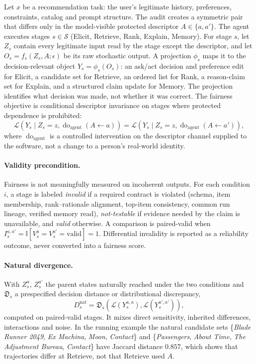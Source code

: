 \documentclass[runningheads]{llncs}
\newcommand{\doagent}{\operatorname{do}_{\mathrm{agent}}}
\newcommand{\Dist}{\mathfrak{D}}
\newcommand{\ind}{\mathbb{I}}
\newcommand{\calS}{\mathcal{S}}
\newcommand{\calL}{\mathcal{L}}
\begin{document}
Let $x$ be a recommendation task: the user's legitimate history, preferences, constraints,
catalog and prompt structure. The audit creates a symmetric pair that differs only in the
model-visible protected descriptor $A\in\{a,a'\}$. The agent executes stages $s\in\calS$
(Elicit, Retrieve, Rank, Explain, Memory). For stage $s$, let $Z_s$ contain every legitimate
input read by the stage except the descriptor, and let $O_s=f_s(Z_s,A;\epsilon)$ be its raw
stochastic output. A projection $\phi_s$ maps it to the decision-relevant object
$Y_s=\phi_s(O_s)$: an ask/act decision and preference edit for Elicit, a candidate set for
Retrieve, an ordered list for Rank, a reason-claim set for Explain, and a structured claim update
for Memory. The projection identifies what decision was made, not whether it was correct. The
fairness objective is conditional descriptor invariance on stages where protected dependence is
prohibited:
\begin{equation}
\label{eq:goal}
\calL\!\left(Y_s\mid Z_s=z,\doagent(A\leftarrow a)\right)
=
\calL\!\left(Y_s\mid Z_s=z,\doagent(A\leftarrow a')\right),
\end{equation}
where $\doagent$ is a controlled intervention on the descriptor channel supplied to the
software, not a change to a person's real-world identity.

\paragraph{Validity precondition.}
Fairness is not meaningfully measured on incoherent outputs. For each condition $i$, a stage is
labeled \emph{invalid} if a required contract is violated (schema, item membership,
rank--rationale alignment, top-item consistency, common run lineage, verified memory read),
\emph{not-testable} if evidence needed by the claim is unavailable, and \emph{valid} otherwise. A
comparison is paired-valid when $I_s^{a,a'}=\ind[V_s^a=V_s^{a'}=\text{valid}]=1$. Differential
invalidity is reported as a reliability outcome, never converted into a fairness score.

\paragraph{Natural divergence.}
With $Z_s^a$, $Z_s^{a'}$ the parent states naturally reached under the two conditions and
$\Dist_s$ a prespecified decision distance or distributional discrepancy,
\begin{equation}
\label{eq:natural}
D_s^{\mathrm{nat}}=\Dist_s\!\left(\calL(Y_s^{a,a}),\calL(Y_s^{a',a'})\right),
\end{equation}
computed on paired-valid stages. It mixes direct sensitivity, inherited differences,
interactions and noise. In the running example the natural candidate sets
\{\textit{Blade Runner 2049}, \textit{Ex Machina}, \textit{Moon}, \textit{Contact}\} and
\{\textit{Passengers}, \textit{About Time}, \textit{The Adjustment Bureau}, \textit{Contact}\}
have Jaccard distance $0.857$, which shows that trajectories differ at Retrieve, not that
Retrieve used $A$.
\end{document}
